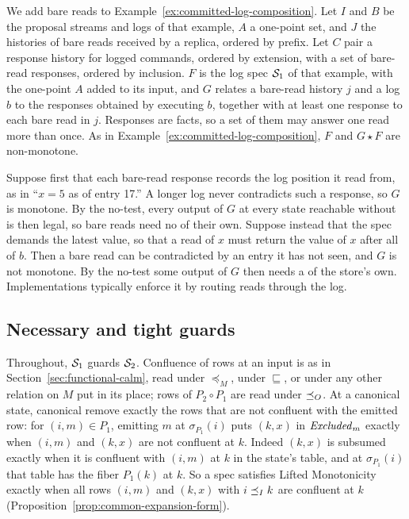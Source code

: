 \begin{example}
\label{ex:bare-reads}
We add bare reads to Example~\ref{ex:committed-log-composition}.  Let $I$
and $B$ be the proposal streams and logs of that example, $A$ a one-point set,
and $J$ the histories of bare reads received by a replica, ordered by prefix.
Let $C$ pair a response history for logged commands, ordered by extension,
with a set of bare-read responses, ordered by inclusion.  $F$ is the log spec
$\mathcal{S}_1$ of that example, with the one-point $A$ added to its input, and $G$
relates a bare-read history $j$ and a log $b$ to the responses
obtained by executing $b$, together with at least one response to each bare
read in $j$.  Responses are facts, so a set of them may answer one read more
than once.  As in Example~\ref{ex:committed-log-composition}, $F$ and
$G\star F$ are non-monotone.

Suppose first that each bare-read response records the log position it read
from, as in ``$x=5$ as of entry 17.''  A longer log never contradicts such a
response, so $G$ is monotone.  By the no-\commitment test, every output of
$G$ at every state reachable without \commitment is then legal, so bare reads
need no \commitment of their own.  Suppose instead that the spec
demands the latest value, so that a read of $x$ must return the value of $x$
after all of $b$.  Then a bare read can be contradicted by an entry it has not
seen, and $G$ is not monotone.  By the no-\commitment test some output of $G$
then needs a \commitment of the store's own.  Implementations typically
enforce it by routing reads through the log.
\end{example}

\subsection{Necessary and tight guards}
\label{app:tight}

Throughout, $\mathcal{S}_1$ guards $\mathcal{S}_2$.  Confluence of rows at an input is
as in Section~\ref{sec:functional-calm}, read under $\preceq_M$, under
$\sqsubseteq$, or under any other relation on $M$ put in its place; rows of
$P_2\circ P_1$ are read under $\preceq_O$.  At a canonical state, canonical
\commitments remove exactly the rows that are not confluent with the emitted row: for
$(i,m)\in P_1$, emitting $m$ at $\sigma_{P_1}(i)$ puts $(k,x)$ in
$\mathit{Excluded}_m$ exactly when $(i,m)$ and $(k,x)$ are not confluent at $k$.
Indeed $(k,x)$ is subsumed exactly when it is confluent with $(i,m)$ at $k$
in the state's table, and at $\sigma_{P_1}(i)$ that table has the fiber
$P_1(k)$ at $k$.  So a spec satisfies Lifted Monotonicity exactly when all rows $(i,m)$ and $(k,x)$ with $i\preceq_I k$ are confluent at $k$
(Proposition~\ref{prop:common-expansion-form}).

